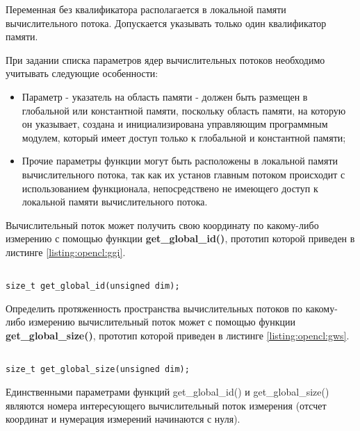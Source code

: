 		Переменная без квалификатора располагается в локальной памяти вычислительного потока. Допускается указывать только один квалификатор памяти.

		При задании списка параметров ядер вычислительных потоков необходимо учитывать следующие особенности:

		\begin{itemize}

			\item Параметр - указатель на область памяти - должен быть размещен в глобальной или константной памяти, поскольку область памяти, на которую он указывает, создана и инициализирована управляющим программным модулем, который имеет доступ только к глобальной и константной памяти;

			\item Прочие параметры функции могут быть расположены в локальной памяти вычислительного потока, так как их установ главным потоком происходит с использованием функционала, непосредствено не имеющего доступ к локальной памяти вычислительного потока.

		\end{itemize}


		Вычислительный поток может получить свою координату по какому-либо измерению с помощью функции {\bf get\_global\_id()}, прототип которой приведен в листинге \ref{listing:opencl:ggi}.

\begin{lstlisting}

size_t get_global_id(unsigned dim);

\end{lstlisting}
\mylistingend

		Определить протяженность пространства вычислительных потоков по какому-либо измерению вычислительный поток может с помощью функции {\bf get\_global\_size()}, прототип которой приведен в листинге \ref{listing:opencl:gws}.

\begin{lstlisting}

size_t get_global_size(unsigned dim);

\end{lstlisting}
\mylistingend

		Единственными параметрами функций get\_global\_id() и get\_global\_size() являются номера интересующего вычислительный поток измерения (отсчет координат и нумерация измерений начинаются с нуля).

